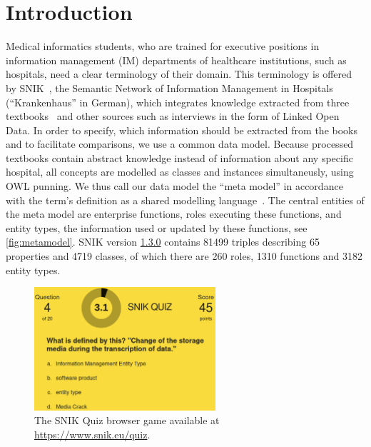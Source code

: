 \documentclass{IOS-Book-Article}     %
\newcommand{\citep}{\cite}%
\newcommand{\snikversion}{1.3.0}
\newcommand{\snikversionlink}{\href{https://github.com/snikproject/ontology/releases/tag/\snikversion}{\snikversion}}
\newcommand{\sniktriples}{\num{81499}}
\newcommand{\snikclasses}{\num{4719}}
\newcommand{\snikroles}{260}
\newcommand{\snikfunctions}{\num{1310}}
\newcommand{\snikentitytypes}{\num{3182}}
\newcommand{\snikproperties}{65}
\begin{document}
\section{Introduction}
Medical informatics students, who are trained for executive positions in information management (IM) departments of healthcare institutions, such as hospitals, need a clear terminology of their domain.
This terminology is offered by SNIK~\citep{semantischesnetz,sniktec}, the Semantic Network of Information Management in Hospitals (\enquote{Krankenhaus} in German), which integrates knowledge extracted from three textbooks~\citep{bb,ob,he} and other sources such as interviews in the form of Linked Open Data.
In order to specify, which information should be extracted from the books and to facilitate comparisons, we use a common data model.
Because processed textbooks contain abstract knowledge instead of information about any specific hospital, all concepts are modelled as classes and instances simultaneusly, using OWL punning.
We thus call our data model the \enquote{meta model} in accordance with the term's definition as a shared modelling language~\citep[p.~8]{ob}.
The central entities of the meta model are enterprise functions, roles executing these functions, and entity types, the information used or updated by these functions, see \cref{fig:metamodel}.
SNIK version \snikversionlink{} contains \sniktriples{} triples describing \snikproperties{} properties and \snikclasses{} classes, of which there are \snikroles{} roles, \snikfunctions{} functions and \snikentitytypes{} entity types.
%
\begin{figure}
\caption{The SNIK Quiz browser game available at \url{https://www.snik.eu/quiz}.}
\label{fig:snikquiz}
\centering
\includegraphics[width=0.6\textwidth]{img/snik-quiz.png}
\end{figure}
\end{document}
